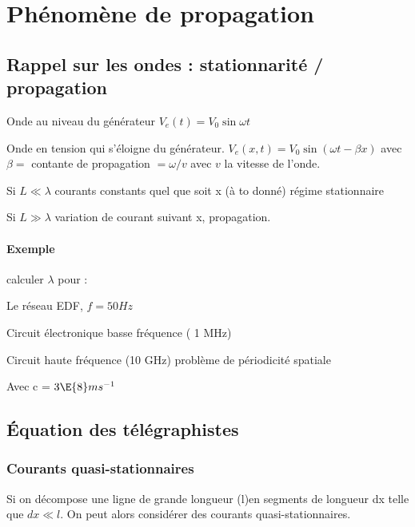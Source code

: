 \documentclass[12pt,a4paper]{report}
\begin{document}
\section{Phénomène de propagation}

\subsection{Rappel sur les ondes : stationnarité / propagation}

Onde au niveau du générateur $ V_e(t) = V_0 \sin \omega t$

Onde en tension qui s'éloigne du générateur. $ V_e (x, t) = V_0 \sin (\omega t - \beta x)$ avec $ \beta = $ contante de propagation $ = \omega / v$ avec $v$ la vitesse de l'onde.

Si $L \ll \lambda$ courants constants quel que soit x (à to donné) régime stationnaire

Si $L \gg \lambda$ variation de courant suivant x, propagation.

\paragraph{Exemple} calculer $\lambda$ pour :

Le réseau EDF, $f = 50Hz$

Circuit électronique basse fréquence ( 1 MHz)

Circuit haute fréquence (10 GHz) problème de périodicité spatiale

Avec c = $3 \E{8} ms^{-1}$

\subsection{Équation des télégraphistes}

\subsubsection{Courants quasi-stationnaires}

Si on décompose une ligne de grande longueur (l)en segments de longueur dx telle que $dx \ll l$. On peut alors considérer des courants quasi-stationnaires.
\end{document}

